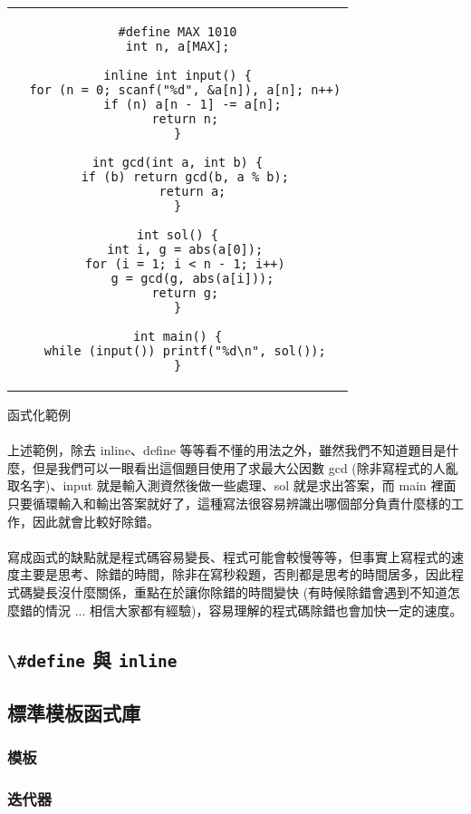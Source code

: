 \documentclass[12pt,a4paper,oneside]{report}
\begin{document}
\begin{CJK}{UTF8}{bkai}
\begin{code}[h!]
\begin{tabular}{c}
\begin{lstlisting}
#define MAX 1010
int n, a[MAX];

inline int input() {
  for (n = 0; scanf("%d", &a[n]), a[n]; n++)
    if (n) a[n - 1] -= a[n];
  return n;
}

int gcd(int a, int b) {
  if (b) return gcd(b, a % b);
    return a;
}

int sol() {
  int i, g = abs(a[0]);
  for (i = 1; i < n - 1; i++)
    g = gcd(g, abs(a[i]));
  return g;
}

int main() {
  while (input()) printf("%d\n", sol());
}
\end{lstlisting}
\end{tabular}
\caption{函式化範例}
\label{program:struct:code:input:function:example}
\end{code}

\paragraph{}上述範例，除去 inline、define 等等看不懂的用法之外，雖然我們不知道題目是什麼，但是我們可以一眼看出這個題目使用了求最大公因數 gcd (除非寫程式的人亂取名字)、input 就是輸入測資然後做一些處理、sol 就是求出答案，而 main 裡面只要循環輸入和輸出答案就好了，這種寫法很容易辨識出哪個部分負責什麼樣的工作，因此就會比較好除錯。

\paragraph{}寫成函式的缺點就是程式碼容易變長、程式可能會較慢等等，但事實上寫程式的速度主要是思考、除錯的時間，除非在寫秒殺題，否則都是思考的時間居多，因此程式碼變長沒什麼關係，重點在於讓你除錯的時間變快 (有時候除錯會遇到不知道怎麼錯的情況 ... 相信大家都有經驗)，容易理解的程式碼除錯也會加快一定的速度。

\subsection{\lstinline!\#define! 與 \lstinline!inline!}

\subsection{標準模板函式庫}

\subsubsection{模板}

\subsubsection{迭代器}


\end{CJK}
\end{document}
